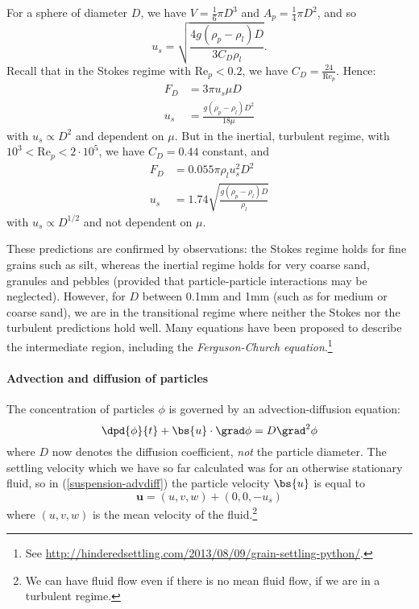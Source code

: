 For a sphere of diameter $D$, we have $V = \frac{1}{6}\pi D^3$ and $A_p = \frac{1}{4}\pi D^2$, and so
\begin{equation}
    u_s=\sqrt{\frac{4g(\rho_p-\rho_l)D}{3C_D\rho_l}}.
\end{equation}
Recall that in the Stokes regime with $\mathrm{Re}_p < 0.2$, we have $C_D=\frac{24}{\mathrm{Re}_p}$. Hence:
\begin{align}
    F_D &= 3\pi u_s \mu D \\
    u_s &= \frac{g(\rho_p-\rho_l)D^2}{18\mu}
\end{align}
with $u_s \propto D^2$ and dependent on $\mu$. But in the inertial, turbulent regime, with $10^3 < \mathrm{Re}_p < 2\cdot10^5$, we have $C_D=0.44$ constant, and 
\begin{align}
    F_D &= 0.055\pi\rho_lu_s^2D^2 \\
    u_s &= 1.74\sqrt{\frac{g(\rho_p-\rho_l)D}{\rho_l}}
\end{align}
with $u_s \propto D^{1/2}$ and not dependent on $\mu$.

These predictions are confirmed by observations: the Stokes regime holds for fine grains such as silt, whereas the inertial regime holds for very coarse sand, granules and pebbles (provided that particle-particle interactions may be neglected). However, for $D$ between 0.1mm and 1mm (such as for medium or coarse sand), we are in the transitional regime where neither the Stokes nor the turbulent predictions hold well. Many equations have been proposed to describe the intermediate region, including the \textit{Ferguson-Church equation}.\footnote{See \url{http://hinderedsettling.com/2013/08/09/grain-settling-python/}.}

\paragraph{Advection and diffusion of particles} The concentration of particles $\phi$ is governed by an advection-diffusion equation:
\begin{equation}
	\dpd{\phi}{t} + \bs{u}\cdot\grad\phi = D\grad^2\phi
	\label{suspension-advdiff}
\end{equation}
where $D$ now denotes the diffusion coefficient, \textit{not} the particle diameter. The settling velocity which we have so far calculated was for an otherwise stationary fluid, so in (\ref{suspension-advdiff}) the particle velocity $\bs{u}$ is equal to
\begin{equation}
 	\mathbf{u} = (u, v, w) + (0, 0, -u_s)
\end{equation}
where $(u,v,w)$ is the mean velocity of the fluid.\footnote{We can have fluid flow even if there is no mean fluid flow, if we are in a turbulent regime.}

